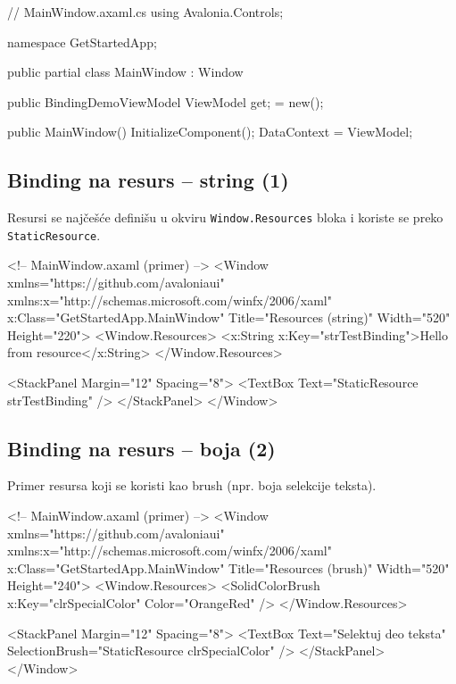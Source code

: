 \documentclass[11pt,a4paper]{article}
\begin{document}
\begin{CodeBlock}
// MainWindow.axaml.cs
using Avalonia.Controls;

namespace GetStartedApp;

public partial class MainWindow : Window
{
    public BindingDemoViewModel ViewModel { get; } = new();

    public MainWindow()
    {
        InitializeComponent();
        DataContext = ViewModel;
    }
}
\end{CodeBlock}

\subsection{Binding na resurs – string (1)}
Resursi se najčešće definišu u okviru \texttt{Window.Resources} bloka i koriste se preko \texttt{StaticResource}.

\begin{CodeBlock}
<!-- MainWindow.axaml (primer) -->
<Window xmlns="https://github.com/avaloniaui"
        xmlns:x="http://schemas.microsoft.com/winfx/2006/xaml"
        x:Class="GetStartedApp.MainWindow"
        Title="Resources (string)" Width="520" Height="220">
  <Window.Resources>
    <x:String x:Key="strTestBinding">Hello from resource</x:String>
  </Window.Resources>

  <StackPanel Margin="12" Spacing="8">
    <TextBox Text="{StaticResource strTestBinding}" />
  </StackPanel>
</Window>
\end{CodeBlock}

\subsection{Binding na resurs – boja (2)}
Primer resursa koji se koristi kao brush (npr. boja selekcije teksta).

\begin{CodeBlock}
<!-- MainWindow.axaml (primer) -->
<Window xmlns="https://github.com/avaloniaui"
        xmlns:x="http://schemas.microsoft.com/winfx/2006/xaml"
        x:Class="GetStartedApp.MainWindow"
        Title="Resources (brush)" Width="520" Height="240">
  <Window.Resources>
    <SolidColorBrush x:Key="clrSpecialColor" Color="OrangeRed" />
  </Window.Resources>

  <StackPanel Margin="12" Spacing="8">
    <TextBox Text="Selektuj deo teksta" SelectionBrush="{StaticResource clrSpecialColor}" />
  </StackPanel>
</Window>
\end{CodeBlock}
\end{document}
